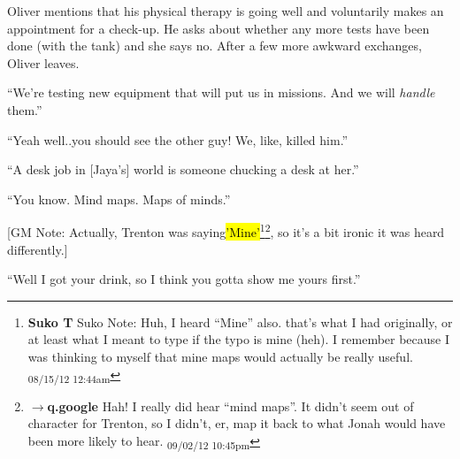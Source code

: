 Oliver mentions that his physical therapy is going well and voluntarily makes an appointment for a check-up.  He asks about whether any more tests have been done (with the tank) and she says no.  After a few more awkward exchanges, Oliver leaves.






``We're testing new equipment that will put us in missions. And we will \textit{handle }them.''






``Yeah well..you should see the other guy!  We, like, killed him.''




``A desk job in {[}Jaya's{]} world is someone chucking a desk at her.''




``You know.  Mind maps.  Maps of minds.''


{[}GM Note: Actually, Trenton was saying\hl{'Mine'}\footnote{\textbf{Suko T }Suko Note: Huh, I heard ``Mine'' also. that's what I had originally, or at least what I meant to type if the typo is mine (heh).  I remember because I was thinking to myself that mine maps would actually be really useful. \textsubscript{08/15/12 12:44am}}\footnote{$\rightarrow$\textbf{q.google }Hah!  I really did hear ``mind maps''.  It didn't seem out of character for Trenton, so I didn't, er, map it back to what Jonah would have been more likely to hear. \textsubscript{09/02/12 10:45pm}}, so it's a bit ironic it was heard differently.{]}



``Well I got your drink, so I think you gotta show me yours first.''






